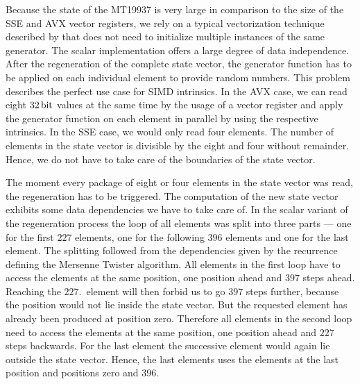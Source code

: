 \documentclass{stdlocal}
\begin{document}
    Because the state of the MT19937 is very large in comparison to the size of the SSE and AVX vector registers, we rely on a typical vectorization technique described by \textcite{fog2015} that does not need to initialize multiple instances of the same generator.
    The scalar implementation offers a large degree of data independence.
    After the regeneration of the complete state vector, the generator function has to be applied on each individual element to provide random numbers.
    This problem describes the perfect use case for SIMD intrinsics.
    In the AVX case, we can read eight $32\, \mathrm{bit}$ values at the same time by the usage of a vector register and apply the generator function on each element in parallel by using the respective intrinsics.
    In the SSE case, we would only read four elements.
    The number of elements in the state vector is divisible by the eight and four without remainder.
    Hence, we do not have to take care of the boundaries of the state vector.

    The moment every package of eight or four elements in the state vector was read, the regeneration has to be triggered.
    The computation of the new state vector exhibits some data dependencies we have to take care of.
    In the scalar variant of the regeneration process the loop of all elements was split into three parts --- one for the first $227$ elements, one for the following $396$ elements and one for the last element.
    The splitting followed from the dependencies given by the recurrence defining the Mersenne Twister algorithm.
    All elements in the first loop have to access the elements at the same position, one position ahead and $397$ steps ahead.
    Reaching the $227$.~element will then forbid us to go $397$ steps further, because the position would not lie inside the state vector.
    But the requested element has already been produced at position zero.
    Therefore all elements in the second loop need to access the elements at the same position, one position ahead and $227$ steps backwards.
    For the last element the successive element would again lie outside the state vector.
    Hence, the last elements uses the elements at the last position and positions zero and $396$.
\end{document}
